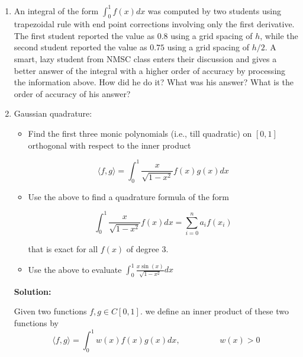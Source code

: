\documentclass[a4paper,11pt]{report}
\begin{document}
\doublespacing
\begin{enumerate}

    \item An integral of the form $\displaystyle \int_{0}^{1} f(x) dx$ was computed
    by two students using trapezoidal rule with end point corrections involving only
    the first derivative. The first student reported the value as $0.8$ using a grid
    spacing of $h$, while the second student reported the value as $0.75$ using a grid
    spacing of $h/2$. A smart, lazy student from NMSC class enters their discussion
    and gives a better answer of the integral with a higher order of accuracy by processing
    the information above. How did he do it? What was his answer? What is the order of
    accuracy of his answer?

    \item Gaussian quadrature:
    \begin{itemize}
        \item Find the first three monic polynomials (i.e., till quadratic) on $[0, 1]$
        orthogonal with respect to the inner product

            \begin{equation*}
            \langle f, g \rangle = \int_{0}^{1} \frac{x}{\sqrt{1 - x^{2}}} f(x) g(x) dx
            \end{equation*}

        \item Use the above to find a quadrature formula of the form

            \begin{equation*}
            \int_{0}^{1} \frac{x}{\sqrt{1 - x^{2}}} f(x) dx = \sum_{i=0}^{n} a_{i} f(x_{i})
            \end{equation*}

        that is exact for all $f(x)$ of degree $3$.

        \item Use the above to evaluate $\displaystyle \int_{0}^{1} \frac{x \sin(x)}
        {\sqrt{1 - x^{2}}} dx$
    \end{itemize}

    \textbf{Solution:}

    Given two functions $f, g \in C[0, 1]$. we define an inner product of these two functions by
    \begin{equation*}
    \langle f, g \rangle = \int_{0}^{1} w(x) f(x) g(x) dx, \hspace{2cm} w(x) > 0
    \end{equation*}
        

\end{enumerate}
\end{document}
